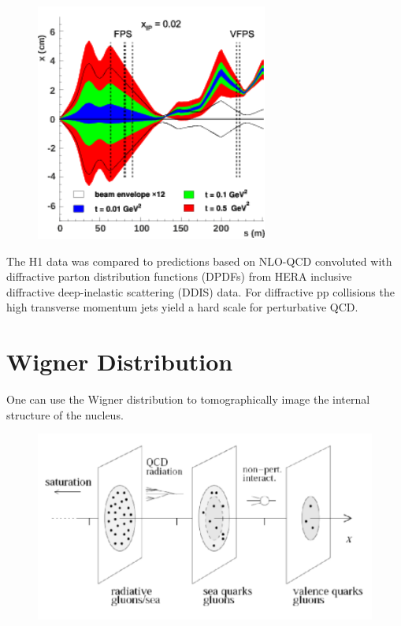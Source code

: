 \begin{figure}[h!]
\begin{centering}
\includegraphics[width=3in]{Chapter2/importfigs/fig7_h1_2015.png}
\par\end{centering}
\end{figure}

The H1 data was compared to predictions based on NLO-QCD convoluted with diffractive parton distribution functions (DPDFs) from HERA inclusive diffractive deep-inelastic scattering (DDIS) data. For diffractive pp collisions the high transverse momentum jets yield a hard scale for perturbative QCD. 

\section{Wigner Distribution}

One can use the Wigner distribution to tomographically image the internal structure of the nucleus.

\begin{figure}[h!]
\begin{centering}
\includegraphics[width=7in]{Chapter2/importfigs/imaging_the_nucleon_upc_dijets_pres.png}
\par\end{centering}
\end{figure}

